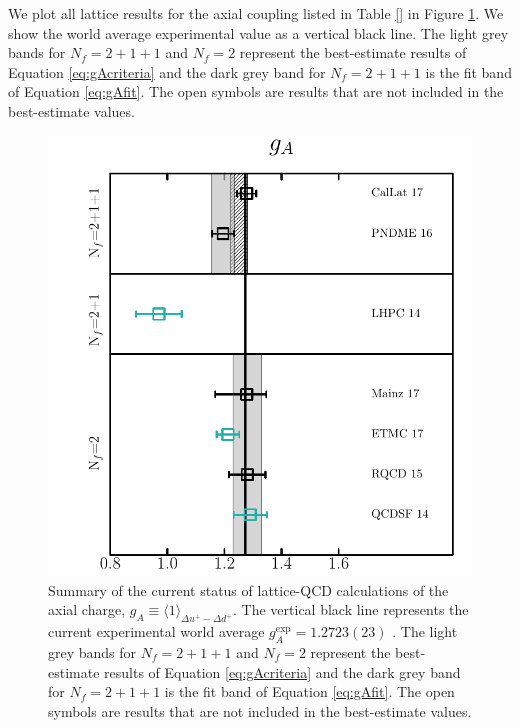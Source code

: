 We plot all lattice results for the axial coupling listed in Table \ref{} in Figure \ref{fig:gaLQCDstatus}. We show the world average experimental value as a vertical
black line. The light grey bands for $N_f = 2+1+1$ and $N_f=2$ represent the best-estimate results of Equation \eqref{eq:gAcriteria} and the dark grey band for
$N_f = 2+1+1$ is the fit band of Equation \eqref{eq:gAfit}. The open symbols are results that are not included in the best-estimate values.
\begin{figure}
\begin{center}
  \includegraphics[scale=0.5]{plots/ga_summary.pdf}
  \caption{\small Summary of the current status of lattice-QCD calculations of the axial charge, $g_A\equiv \langle 1\rangle_{\Delta u^+-\Delta d^+}$.
  The vertical black line represents the current experimental world average $g_A^{\mathrm{exp}} = 1.2723(23)$ \cite{Olive:2016xmw}. The light grey bands for $N_f = 2+1+1$ and $N_f=2$ represent the best-estimate results of Equation \eqref{eq:gAcriteria} and the dark grey band for
$N_f = 2+1+1$ is the fit band of Equation \eqref{eq:gAfit}. The open symbols are results that are not included in the best-estimate values.
    \label{fig:gaLQCDstatus}
  }
\end{center}
\end{figure}

